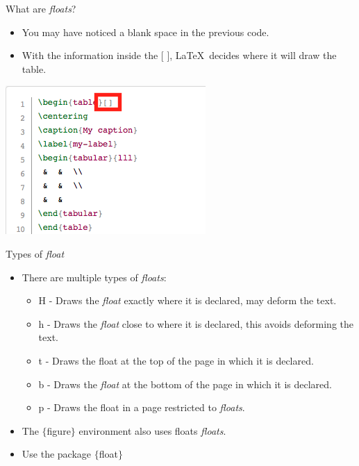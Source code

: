 \documentclass[usenames,dvipsnames,aspectratio=169]{beamer}
\newcommand{\aitem}{\item[$\cdot$]}
\newcommand{\bitem}{\item[-]}
\begin{document}

\begin{frame}[t]{What are \textit{floats}?}
\begin{minipage}{5cm}
\begin{itemize}
\aitem You may have noticed a blank space in the previous code.
\aitem With the information inside the \textcolor{PineGreen}{[ ]}, \LaTeX~decides where it will draw the table.
\end{itemize}
\end{minipage}%
\hspace*{1cm}%
\begin{minipage}{8cm}
\includegraphics[width=\linewidth]{floats1.png}
\end{minipage}

\end{frame}


\begin{frame}[t]{Types of \textit{float}}
\begin{itemize}
\aitem There are multiple types of \textit{floats}:
\begin{itemize}
\bitem H - Draws the \textit{float} exactly where it is declared, may deform the text.
\bitem h - Draws the \textit{float} close to where it is declared, this avoids deforming the text.
\bitem t - Draws the float at the top of the page in which it is declared.
\bitem b - Draws the \textit{float} at the bottom of the page in which it is declared.
\bitem p -  Draws the float in a page restricted to \textit{floats}.
\end{itemize}
\aitem The \textcolor{PineGreen}{$\{$figure$\}$} environment also uses floats \textit{floats}.
\aitem Use the package \textcolor{PineGreen}{$\{$float$\}$}
\end{itemize}
\end{frame}
\end{document}
